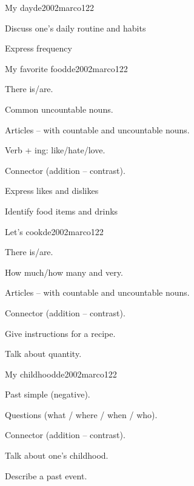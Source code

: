 \begin{syllabus}
\begin{unit}{My day}{}{de2002marco}{12}{2}
   \begin{learningoutcomes}
      \item Discuss one’s daily routine and habits
      \item Express frequency
   \end{learningoutcomes}
\end{unit}

\begin{unit}{My favorite food}{}{de2002marco}{12}{2}
   \begin{topics}
      \item There is/are.
      \item Common uncountable nouns.
      \item Articles – with countable and uncountable nouns.
      \item Verb + ing: like/hate/love.
      \item Connector (addition – contrast).
   \end{topics}

   \begin{learningoutcomes}
      \item Express likes and dislikes
      \item Identify food items and drinks
   \end{learningoutcomes}

\end{unit}

\begin{unit}{Let's cook}{}{de2002marco}{12}{2}
   \begin{topics}
      \item There is/are.
      \item How much/how many and very.
      \item Articles – with countable and uncountable nouns.
      \item Connector (addition – contrast).
   \end{topics}

   \begin{learningoutcomes}
      \item Give instructions for a recipe.
      \item Talk about quantity.
   \end{learningoutcomes}

\end{unit}

\begin{unit}{My childhood}{}{de2002marco}{12}{2}
   \begin{topics}
      \item Past simple (negative).
      \item Questions (what / where / when / who).
      \item Connector (addition – contrast).
   \end{topics}
   \begin{learningoutcomes}
      \item Talk about one’s childhood.
      \item Describe a past event.
   \end{learningoutcomes}
\end{unit}


\end{syllabus}
